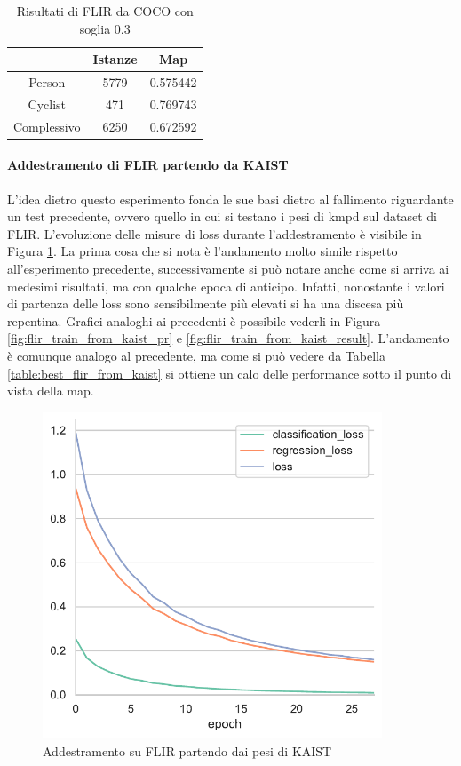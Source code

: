 \begin{table}[]
    \centering
    \begin{tabular}{c|c|c|}
    \cline{2-3}
     & Istanze & Map \\ \hline
    \multicolumn{1}{|c|}{Person} & 5779 & 0.575442 \\ \hline
    \multicolumn{1}{|c|}{Cyclist} & 471 & 0.769743 \\ \hline
    \multicolumn{1}{|c|}{Complessivo} & 6250 & 0.672592 \\ \hline
    \end{tabular}
    \caption{Risultati di FLIR da COCO con soglia $0.3$}
    \label{table:coco_result_best_flir}
\end{table}


\paragraph{Addestramento di FLIR partendo da KAIST}
L'idea dietro questo esperimento fonda le sue basi dietro al fallimento riguardante un test precedente, ovvero quello in cui si testano i pesi di \ac{kmpd} sul dataset di FLIR. L'evoluzione delle misure di loss durante l'addestramento è visibile in Figura \ref{fig:flir_train_from_kaist}. La prima cosa che si nota è l'andamento molto simile rispetto all'esperimento precedente, successivamente si può notare anche come si arriva ai medesimi risultati, ma con qualche epoca di anticipo. Infatti, nonostante i valori di partenza delle loss sono sensibilmente più elevati si ha una discesa più repentina. Grafici analoghi ai precedenti è possibile vederli in Figura \ref{fig:flir_train_from_kaist_pr} e \ref{fig:flir_train_from_kaist_result}. L'andamento è comunque analogo al precedente, ma come si può vedere da Tabella \ref{table:best_flir_from_kaist} si ottiene un calo delle performance sotto il punto di vista della \ac{map}. 
\begin{figure}[]
    \centering
    \includegraphics[width=0.9\textwidth]{images/graphic/flir_from_kaist.pdf}
    \caption{Addestramento su FLIR partendo dai pesi di KAIST}
    \label{fig:flir_train_from_kaist}
\end{figure}
